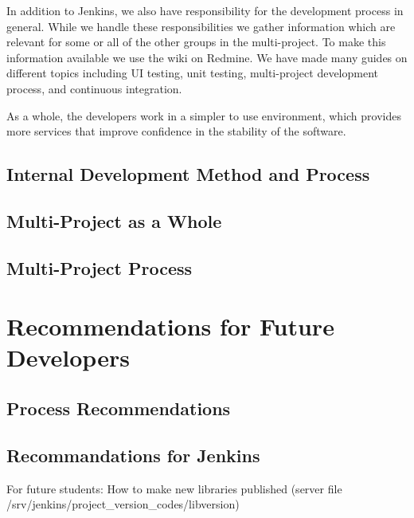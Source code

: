 In addition to Jenkins, we also have responsibility for the development process in general. While we handle these responsibilities we gather information which are relevant for some or all of the other groups in the multi-project. To make this information available we use the wiki on Redmine. We have made many guides on different topics including UI testing, unit testing, multi-project development process, and continuous integration.

As a whole, the developers work in a simpler to use environment, which provides more services that improve confidence in the stability of the software.

\section{Internal Development Method and Process}\label{conc:internalprocess}

\section{Multi-Project as a Whole}\label{conc:multi_project_eval}

\section{Multi-Project Process}\label{conc:multi_project_process_eval}

\chapter{Recommendations for Future Developers}\label{chap:future_dev_recommendations}


\section{Process Recommendations}

\section{Recommandations for Jenkins}
For future students: How to make new libraries published (server file /srv/jenkins/project\_version\_codes/libversion)
